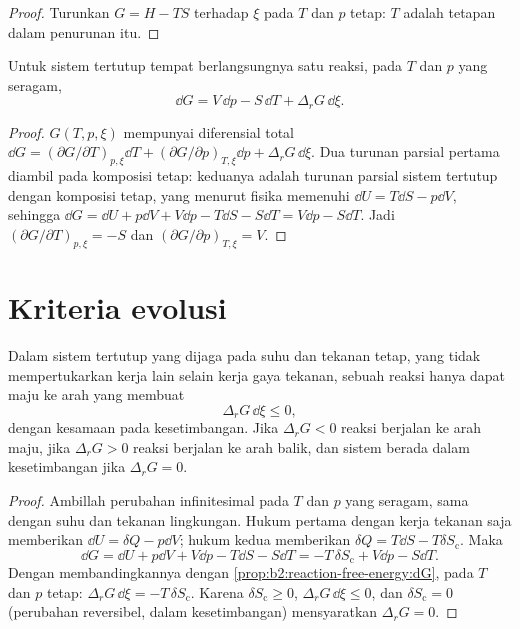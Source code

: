 \begin{proof}
Turunkan $G = H - TS$ terhadap $\xi$ pada $T$ dan $p$ tetap: $T$ adalah
tetapan dalam penurunan itu.
\end{proof}

\begin{proposition}\label{prop:b2:reaction-free-energy:dG}
Untuk sistem tertutup tempat berlangsungnya satu reaksi, pada $T$ dan
$p$ yang seragam,
\[
  \dd G = V\,\dd p - S\,\dd T + \Delta_r G\,\dd\xi .
\]
\end{proposition}

\begin{proof}
$G(T, p, \xi)$ mempunyai diferensial total $\dd G = (\partial G/\partial
T)_{p,\xi}\dd T + (\partial G/\partial p)_{T,\xi}\dd p + \Delta_r G\,\dd\xi$.
Dua turunan parsial pertama diambil pada komposisi tetap: keduanya adalah
turunan parsial sistem tertutup dengan komposisi tetap, yang menurut
fisika memenuhi $\dd U = T\dd S - p\dd V$, sehingga
$\dd G = \dd U + p\dd V + V\dd p - T\dd S
- S\dd T = V\dd p - S\dd T$.
Jadi $(\partial G/\partial T)_{p,\xi} = -S$ dan
$(\partial G/\partial p)_{T,\xi} = V$.
\end{proof}

\section{Kriteria evolusi}

\begin{theorem}\label{thm:b2:reaction-free-energy:evolution}
Dalam sistem tertutup yang dijaga pada suhu dan tekanan tetap, yang tidak
mempertukarkan kerja lain selain kerja gaya tekanan, sebuah reaksi hanya
dapat maju ke arah yang membuat
\[
  \Delta_r G\,\dd\xi \leq 0 ,
\]
dengan kesamaan pada kesetimbangan. Jika $\Delta_r G < 0$ reaksi berjalan
ke arah maju, jika $\Delta_r G > 0$ reaksi berjalan ke arah balik, dan
sistem berada dalam kesetimbangan jika $\Delta_r G = 0$.
\end{theorem}

\begin{proof}
Ambillah perubahan infinitesimal pada $T$ dan $p$ yang seragam, sama
dengan suhu dan tekanan lingkungan. Hukum pertama dengan kerja tekanan saja
memberikan $\dd U = \delta Q
- p\dd V$; hukum kedua memberikan
$\delta Q = T\dd S - T\delta S_{\text{c}}$. Maka
\[
  \dd G = \dd U + p\dd V + V\dd p - T\dd S - S\dd T = -T\,\delta
  S_{\text{c}} + V\dd p - S\dd T .
\]
Dengan membandingkannya dengan \cref{prop:b2:reaction-free-energy:dG},
pada $T$ dan $p$ tetap: $\Delta_r G\,\dd\xi = -T\,\delta S_{\text{c}}$.
Karena $\delta S_{\text{c}}
\geq 0$, $\Delta_r G\,\dd\xi \leq 0$, dan
$\delta S_{\text{c}} = 0$ (perubahan reversibel, dalam kesetimbangan)
mensyaratkan $\Delta_r G = 0$.
\end{proof}

